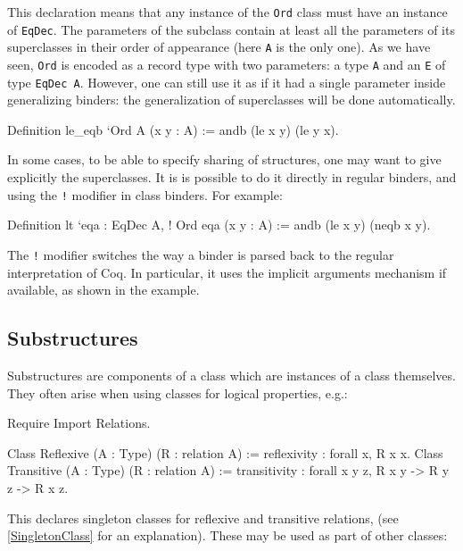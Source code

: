 This declaration means that any instance of the \texttt{Ord} class must
have an instance of \texttt{EqDec}. The parameters of the subclass contain
at least all the parameters of its superclasses in their order of
appearance (here \texttt{A} is the only one).
As we have seen, \texttt{Ord} is encoded as a record type with two parameters:
a type \texttt{A} and an \texttt{E} of type \texttt{EqDec A}. However, one can
still use it as if it had a single parameter inside generalizing binders: the
generalization of superclasses will be done automatically. 
\begin{coq_example*}
Definition le_eqb `{Ord A} (x y : A) := andb (le x y) (le y x).
\end{coq_example*}

In some cases, to be able to specify sharing of structures, one may want to give
explicitly the superclasses. It is is possible to do it directly in regular
binders, and using the \texttt{!} modifier in class binders. For
example:
\begin{coq_example*}
Definition lt `{eqa : EqDec A, ! Ord eqa} (x y : A) := 
  andb (le x y) (neqb x y).
\end{coq_example*}

The \texttt{!} modifier switches the way a binder is parsed back to the
regular interpretation of Coq. In particular, it uses the implicit
arguments mechanism if available, as shown in the example.

\subsection{Substructures}

Substructures are components of a class which are instances of a class
themselves. They often arise when using classes for logical properties,
e.g.:

\begin{coq_eval}
Require Import Relations.
\end{coq_eval}
\begin{coq_example*}
Class Reflexive (A : Type) (R : relation A) :=
  reflexivity : forall x, R x x.
Class Transitive (A : Type) (R : relation A) :=
  transitivity : forall x y z, R x y -> R y z -> R x z.
\end{coq_example*}

This declares singleton classes for reflexive and transitive relations,
(see \ref{SingletonClass} for an explanation).
These may be used as part of other classes:

